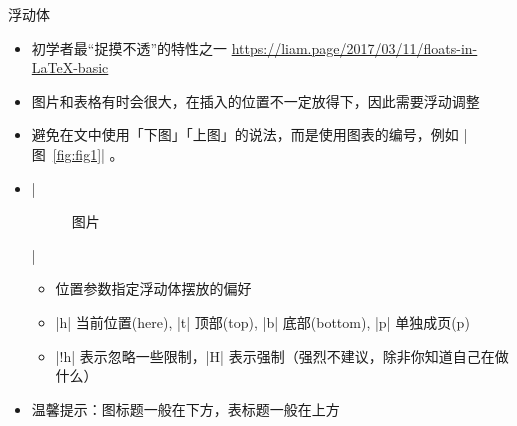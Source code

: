       \begin{frame}[fragile]{浮动体}
      \begin{itemize}
      \item 初学者最“捉摸不透”的特性之一 \url{https://liam.page/2017/03/11/floats-in-LaTeX-basic}
      \item 图片和表格有时会很大，在插入的位置不一定放得下，因此需要浮动调整
      \item 避免在文中使用「下图」「上图」的说法，而是使用图表的编号，例如 |图~\ref{fig:fig1}| 。
      \item |\begin{figure}[<位置>] 图片 \end{figure}|
        \begin{itemize}
        \item 位置参数指定浮动体摆放的偏好
        \item |h| 当前位置(here), |t| 顶部(top), |b| 底部(bottom), |p| 单独成页(p)
        \item |!h| 表示忽略一些限制，|H| 表示强制\alert{（强烈不建议，除非你知道自己在做什么）}
        \end{itemize}
      \item 温馨提示：图标题一般在下方，表标题一般在上方
      \end{itemize}
      \end{frame}
      

